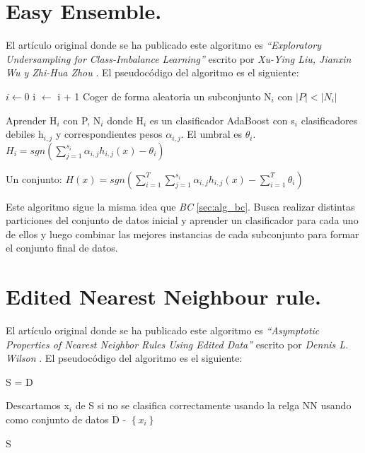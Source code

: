 \section{Easy Ensemble.} \label{sec:alg_ee}
El artículo original donde se ha publicado este algoritmo es \textit{``Exploratory Undersampling for Class-Imbalance Learning''} escrito por \textit{Xu-Ying Liu, Jianxin Wu y Zhi-Hua Zhou} \cite{bc-ee}. El pseudocódigo del algoritmo es el siguiente:

\begin{codigo}
\begin{algorithmic}[1]
\State $i \leftarrow 0$
\State i $\leftarrow$ i + 1
\State Coger de forma aleatoria un subconjunto N$_i$ con $\left | P \right | < \left | N_i \right |$
\State \parbox[t]{305pt}{Aprender H$_i$ con P, N$_i$ donde H$_i$ es un clasificador AdaBoost con s$_i$ clasificadores debiles h$_{i, j}$ y correspondientes pesos $\alpha_{i, j}$. El umbral es $\theta_i$. $H_i = sgn(\sum_{j=1}^{s_i} \alpha_{i, j} h_{i, j}(x) - \theta_i)$\strut}
\EndWhile
\State \Return Un conjunto: $H(x) = sgn(\sum_{i=1}^{T} \sum_{j=1}^{s_i} \alpha_{i, j} h_{i, j}(x) - \sum_{i=1}^{T} \theta_i)$
\EndFunction 
\end{algorithmic}
\end{codigo}

Este algoritmo sigue la misma idea que \textit{BC} \ref{sec:alg_bc}. Busca realizar distintas particiones del conjunto de datos inicial y aprender un clasificador para cada uno de ellos y luego combinar las mejores instancias de cada subconjunto para formar el conjunto final de datos.

\section{Edited Nearest Neighbour rule.} \label{sec:alg_enn}
El artículo original donde se ha publicado este algoritmo es \textit{``Asymptotic Properties of Nearest Neighbor Rules Using Edited Data''} escrito por \textit{Dennis L. Wilson} \cite{enn}. El pseudocódigo del algoritmo es el siguiente:

\begin{codigo}
\begin{algorithmic}[1]
\State S = D
\State \parbox[t]{305pt}{Descartamos x$_i$ de S si no se clasifica correctamente usando la relga NN usando como conjunto de datos D - $\left \{ x_i \right \}$\strut}
\EndFor
\State \Return S
\EndFunction 
\end{algorithmic}
\end{codigo}

